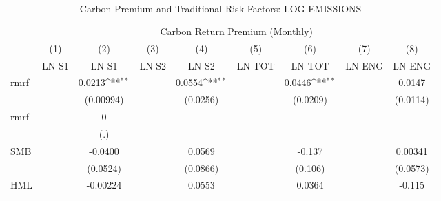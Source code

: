 \begin{table}[htbp]\centering
\def\sym#1{\ifmmode^{#1}\else\(^{#1}\)\fi}
\caption{Carbon Premium and Traditional Risk Factors: LOG EMISSIONS}
\begin{tabular}{l*{8}{c}}
\hline\hline
                    &\multicolumn{8}{c}{Carbon Return Premium (Monthly)}                                                                                                                            \\\cmidrule(lr){2-9}
                    &\multicolumn{1}{c}{(1)}&\multicolumn{1}{c}{(2)}&\multicolumn{1}{c}{(3)}&\multicolumn{1}{c}{(4)}&\multicolumn{1}{c}{(5)}&\multicolumn{1}{c}{(6)}&\multicolumn{1}{c}{(7)}&\multicolumn{1}{c}{(8)}\\
                    &\multicolumn{1}{c}{LN S1}&\multicolumn{1}{c}{LN S1}&\multicolumn{1}{c}{LN S2}&\multicolumn{1}{c}{LN S2}&\multicolumn{1}{c}{LN TOT}&\multicolumn{1}{c}{LN TOT}&\multicolumn{1}{c}{LN ENG}&\multicolumn{1}{c}{LN ENG}\\
\hline
rmrf                &                     &      0.0213\sym{**} &                     &      0.0554\sym{**} &                     &      0.0446\sym{**} &                     &      0.0147         \\
                    &                     &   (0.00994)         &                     &    (0.0256)         &                     &    (0.0209)         &                     &    (0.0114)         \\
rmrf                &                     &           0         &                     &                     &                     &                     &                     &                     \\
                    &                     &         (.)         &                     &                     &                     &                     &                     &                     \\
SMB                 &                     &     -0.0400         &                     &      0.0569         &                     &      -0.137         &                     &     0.00341         \\
                    &                     &    (0.0524)         &                     &    (0.0866)         &                     &     (0.106)         &                     &    (0.0573)         \\
HML                 &                     &    -0.00224         &                     &      0.0553         &                     &      0.0364         &                     &      -0.115         \\

\end{tabular}
\end{table}
